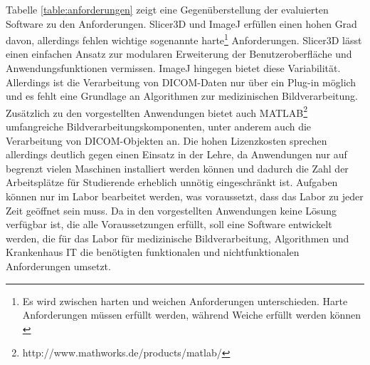 Tabelle \ref{table:anforderungen} zeigt eine Gegenüberstellung der evaluierten Software zu den Anforderungen. Slicer3D und ImageJ erfüllen einen hohen Grad davon, allerdings fehlen wichtige sogenannte harte\footnote{Es wird zwischen harten und weichen Anforderungen unterschieden. Harte Anforderungen müssen erfüllt werden, während Weiche erfüllt werden können \cite[9]{balzert:swa}} Anforderungen. Slicer3D lässt einen einfachen Ansatz zur modularen Erweiterung der Benutzeroberfläche und Anwendungsfunktionen vermissen. ImageJ hingegen bietet diese Variabilität. Allerdings ist die Verarbeitung von DICOM-Daten nur über ein Plug-in möglich und es fehlt eine Grundlage an Algorithmen zur medizinischen Bildverarbeitung. Zusätzlich zu den vorgestellten Anwendungen bietet auch MATLAB\footnote{http://www.mathworks.de/products/matlab/} umfangreiche Bildverarbeitungskomponenten, unter anderem auch die Verarbeitung von DICOM-Objekten an. Die hohen Lizenzkosten sprechen allerdings deutlich gegen einen Einsatz in der Lehre, da Anwendungen nur auf begrenzt vielen Maschinen installiert werden können und dadurch die Zahl der Arbeitsplätze für Studierende erheblich unnötig eingeschränkt ist. Aufgaben können nur im Labor bearbeitet werden, was voraussetzt, dass das Labor zu jeder Zeit geöffnet sein muss.
Da in den vorgestellten Anwendungen keine Lösung verfügbar ist, die alle Voraussetzungen erfüllt, soll eine Software entwickelt werden, die für das Labor für medizinische Bildverarbeitung, Algorithmen und Krankenhaus IT die benötigten funktionalen und nichtfunktionalen Anforderungen umsetzt.